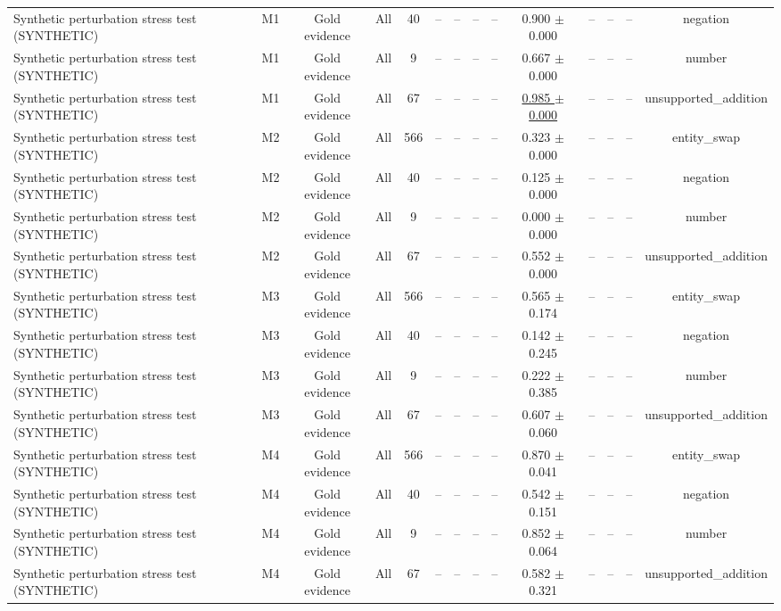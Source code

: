 \begin{table}[t]
{\begin{tabular}{lccccccccccccc}
Synthetic perturbation stress test (SYNTHETIC) & M1 & Gold evidence & All & 40 & -- & -- & -- & -- & 0.900 $\pm$ 0.000 & -- & -- & -- & negation \\
Synthetic perturbation stress test (SYNTHETIC) & M1 & Gold evidence & All & 9 & -- & -- & -- & -- & 0.667 $\pm$ 0.000 & -- & -- & -- & number \\
Synthetic perturbation stress test (SYNTHETIC) & M1 & Gold evidence & All & 67 & -- & -- & -- & -- & \underline{0.985 $\pm$ 0.000} & -- & -- & -- & unsupported\_addition \\
Synthetic perturbation stress test (SYNTHETIC) & M2 & Gold evidence & All & 566 & -- & -- & -- & -- & 0.323 $\pm$ 0.000 & -- & -- & -- & entity\_swap \\
Synthetic perturbation stress test (SYNTHETIC) & M2 & Gold evidence & All & 40 & -- & -- & -- & -- & 0.125 $\pm$ 0.000 & -- & -- & -- & negation \\
Synthetic perturbation stress test (SYNTHETIC) & M2 & Gold evidence & All & 9 & -- & -- & -- & -- & 0.000 $\pm$ 0.000 & -- & -- & -- & number \\
Synthetic perturbation stress test (SYNTHETIC) & M2 & Gold evidence & All & 67 & -- & -- & -- & -- & 0.552 $\pm$ 0.000 & -- & -- & -- & unsupported\_addition \\
Synthetic perturbation stress test (SYNTHETIC) & M3 & Gold evidence & All & 566 & -- & -- & -- & -- & 0.565 $\pm$ 0.174 & -- & -- & -- & entity\_swap \\
Synthetic perturbation stress test (SYNTHETIC) & M3 & Gold evidence & All & 40 & -- & -- & -- & -- & 0.142 $\pm$ 0.245 & -- & -- & -- & negation \\
Synthetic perturbation stress test (SYNTHETIC) & M3 & Gold evidence & All & 9 & -- & -- & -- & -- & 0.222 $\pm$ 0.385 & -- & -- & -- & number \\
Synthetic perturbation stress test (SYNTHETIC) & M3 & Gold evidence & All & 67 & -- & -- & -- & -- & 0.607 $\pm$ 0.060 & -- & -- & -- & unsupported\_addition \\
Synthetic perturbation stress test (SYNTHETIC) & M4 & Gold evidence & All & 566 & -- & -- & -- & -- & 0.870 $\pm$ 0.041 & -- & -- & -- & entity\_swap \\
Synthetic perturbation stress test (SYNTHETIC) & M4 & Gold evidence & All & 40 & -- & -- & -- & -- & 0.542 $\pm$ 0.151 & -- & -- & -- & negation \\
Synthetic perturbation stress test (SYNTHETIC) & M4 & Gold evidence & All & 9 & -- & -- & -- & -- & 0.852 $\pm$ 0.064 & -- & -- & -- & number \\
Synthetic perturbation stress test (SYNTHETIC) & M4 & Gold evidence & All & 67 & -- & -- & -- & -- & 0.582 $\pm$ 0.321 & -- & -- & -- & unsupported\_addition \\
\bottomrule
\end{tabular}}
\end{table}
